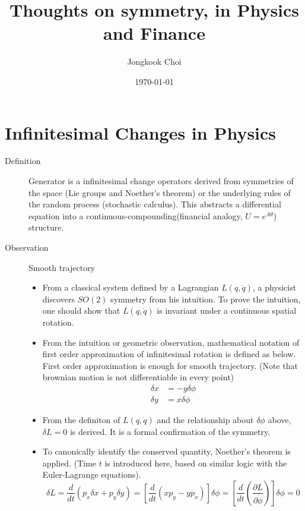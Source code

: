 \documentclass{article}
\title{Thoughts on symmetry, in Physics and Finance}
\author{Jongkook Choi}
\date{\today}
\begin{document}
\maketitle

\section{Infinitesimal Changes in Physics}
\begin{description}
    \item[Definition] Generator is a infinitesimal change operators derived from symmetries of the space (Lie groups and Noether's theorem) or the underlying rules of the random process (stochastic calculus). This abstracts a differential equation into a continuous-compounding(financial analogy, $U = e^{A\theta}$) structure.
    \item[Observation] Smooth trajectory
          \begin{itemize}
              \item From a classical system defined by a Lagrangian $L(q, \dot{q})$, a physicist discovers $SO(2)$ symmetry from his intuition. To prove the intuition, one should show that $L(q, \dot{q})$ is invariant under a continuous spatial rotation.
              \item From the intuition or geometric observation, mathematical notation of first order approximation of infinitesimal rotation is defined as below. First order approximation is enough for smooth trajectory. (Note that brownian motion is not differentiable in every point)
                    \begin{align*}
                        \delta x & = -y \delta\phi \\
                        \delta y & = x \delta\phi
                    \end{align*}
              \item From the definiton of $L(q,\dot{q})$ and the relationship about $\delta\phi$ above, $\delta L = 0$ is derived. It is a formal confirmation of the symmetry.
              \item To canonically identify the conserved quantity, Noether's theorem is applied. (Time $t$ is introduced here, based on similar logic with the Euler-Lagrange equations).
                    \begin{equation*}
                        \delta L = \frac{d}{dt} \left( p_x \delta x + p_y \delta y \right) = \left[ \frac{d}{dt} \left( x p_y - y p_x \right) \right] \delta\phi = \left[ \frac{d}{dt} \left( \frac{\partial L}{\partial \dot{\phi}} \right) \right] \delta\phi = 0

\end{equation*}
\end{itemize}
\end{description}
\end{document}
